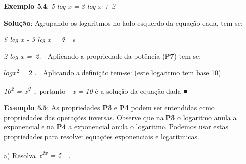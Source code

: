 \documentclass[12pt]{article}
\begin{document}
\begin{enumerate}[label*={\fontsize{14pt}{14pt}\selectfont \textbf{\arabic*.}}]
\begin{adjustwidth}{0.49in}{0.0in}
\end{adjustwidth}


\vspace{\baselineskip}
\begin{justify}
\textbf{Exemplo 5.4}: \textit{5 log x = 3 log x + 2}
\end{justify}\par

\begin{justify}
\textbf{Solução}: Agrupando os logaritmos no lado esquerdo da equação dada, tem-se:
\end{justify}\par

\begin{justify}
\textit{5 log x - 3 log x = 2\ \  e}
\end{justify}\par

\begin{justify}
\textit{2 log x =\  2.\ \  \tab \tab }Aplicando a propriedade da potência (\textbf{P7}) tem-se:
\end{justify}\par

\begin{justify}
 \( logx^{2} =2 \) .\ \  \tab \tab Aplicando a definição tem-se: (este logaritmo tem base 10)
\end{justify}\par

\begin{justify}
\textit{10\textsuperscript{2} = x\textsuperscript{2}}\  ,\ portanto\ \   \textit{x = 10} é a solução da equação dada ■
\end{justify}\par


\vspace{\baselineskip}
\begin{adjustwidth}{0.98in}{0.0in}
\begin{justify}
\textbf{Exemplo 5.5}: As propriedades \textbf{P3} e \textbf{P4} podem ser entendidas como propriedades das operações inversas. Observe que na \textbf{P3} o logaritmo anula a exponencial e na \textbf{P4} a exponencial anula o logaritmo. Podemos usar estas propriedades para resolver equações exponenciais e logarítmicas.
\end{justify}\par

\end{adjustwidth}

\begin{adjustwidth}{0.3in}{0.0in}
\begin{justify}
 a) Resolva\  \textit{e\textsuperscript{2x} = 5}\ \ .  
\end{justify}\par


\end{adjustwidth}
\end{enumerate}
\end{document}
